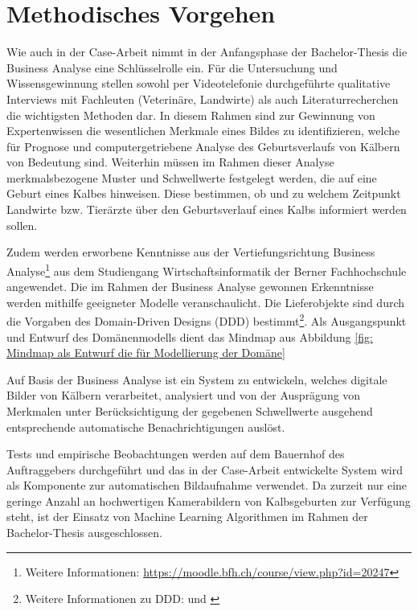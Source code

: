 \chapter{Methodisches Vorgehen}

Wie auch in der Case-Arbeit nimmt in der Anfangsphase der Bachelor-Thesis die Business Analyse eine Schlüsselrolle ein. Für die Untersuchung und Wissensgewinnung stellen sowohl per Videotelefonie durchgeführte qualitative Interviews mit Fachleuten (Veterinäre, Landwirte) als auch Literaturrecherchen die wichtigsten Methoden dar. In diesem Rahmen sind zur Gewinnung von Expertenwissen die wesentlichen Merkmale eines Bildes zu identifizieren, welche für Prognose und computergetriebene Analyse des Geburtsverlaufs von Kälbern von Bedeutung sind.  Weiterhin müssen im Rahmen dieser Analyse merkmalsbezogene Muster und Schwellwerte festgelegt werden, die auf eine Geburt eines Kalbes hinweisen. Diese bestimmen, ob und zu welchem Zeitpunkt Landwirte bzw. Tierärzte über den Geburtsverlauf eines Kalbs informiert werden sollen. 

Zudem werden erworbene Kenntnisse aus der Vertiefungsrichtung Business Analyse\footnote{Weitere Informationen: \url{https://moodle.bfh.ch/course/view.php?id=20247}} aus dem Studiengang Wirtschaftsinformatik der Berner Fachhochschule angewendet.  Die im Rahmen der Business Analyse gewonnen Erkenntnisse werden mithilfe geeigneter Modelle veranschaulicht. Die Lieferobjekte sind durch die Vorgaben des Domain-Driven Designs (DDD) bestimmt\footnote{Weitere Informationen zu DDD: \citep{Evans2015} und \citep{Vernon2016}}. Als Ausgangspunkt und Entwurf des Domänenmodells dient das Mindmap aus Abbildung \ref{fig: Mindmap als Entwurf die für Modellierung der Domäne}

Auf Basis der Business Analyse ist ein System zu entwickeln, welches digitale Bilder von Kälbern verarbeitet, analysiert und von der Ausprägung von Merkmalen unter Berücksichtigung der gegebenen Schwellwerte ausgehend entsprechende automatische Benachrichtigungen auslöst. 

Tests und empirische Beobachtungen werden auf dem Bauernhof des Auftraggebers durchgeführt und das in der Case-Arbeit entwickelte System wird als Komponente zur automatischen Bildaufnahme verwendet. Da zurzeit nur eine geringe Anzahl an hochwertigen Kamerabildern von Kalbsgeburten zur Verfügung steht, ist der Einsatz von Machine Learning Algorithmen im Rahmen der Bachelor-Thesis ausgeschlossen.

